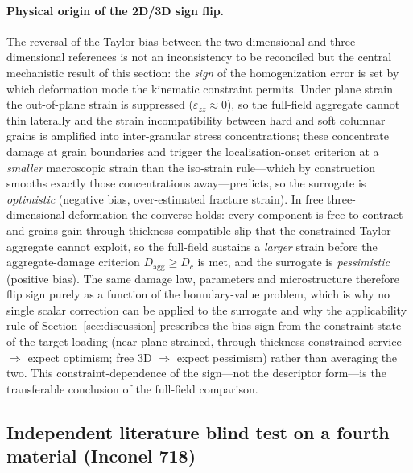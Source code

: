 \documentclass[twocolumn]{sagej}
\begin{document}
\paragraph{Physical origin of the 2D/3D sign flip.}
The reversal of the Taylor bias between the two-dimensional and three-dimensional references is not an
inconsistency to be reconciled but the central mechanistic result of this section: the \emph{sign} of the
homogenization error is set by which deformation mode the kinematic constraint permits. Under plane strain the
out-of-plane strain is suppressed ($\varepsilon_{zz}\approx0$), so the full-field aggregate cannot thin laterally and
the strain incompatibility between hard and soft columnar grains is amplified into inter-granular stress
concentrations; these concentrate damage at grain boundaries and trigger the localisation-onset criterion at a
\emph{smaller} macroscopic strain than the iso-strain rule---which by construction smooths exactly those
concentrations away---predicts, so the surrogate is \emph{optimistic} (negative bias, over-estimated fracture strain).
In free three-dimensional deformation the converse holds: every component is free to contract and grains gain
through-thickness compatible slip that the constrained Taylor aggregate cannot exploit, so the full-field sustains a
\emph{larger} strain before the aggregate-damage criterion $D_{\mathrm{agg}}\ge D_c$ is met, and the surrogate is
\emph{pessimistic} (positive bias). The same damage law, parameters and microstructure therefore flip sign purely as a
function of the boundary-value problem, which is why no single scalar correction can be applied to the surrogate and why
the applicability rule of Section~\ref{sec:discussion} prescribes the bias sign from the constraint state of the target
loading (near-plane-strained, through-thickness-constrained service $\Rightarrow$ expect optimism; free 3D
$\Rightarrow$ expect pessimism) rather than averaging the two. This constraint-dependence of the sign---not the descriptor
form---is the transferable conclusion of the full-field comparison.

\subsection{Independent literature blind test on a fourth material (Inconel 718)}
\label{sec:in718_blind}
\end{document}

